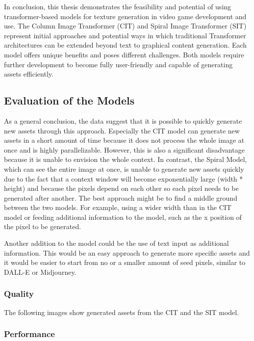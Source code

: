 
    In conclusion, this thesis demonstrates the feasibility and potential of using transformer-based models for texture generation in video game development and use. The Column Image Transformer (CIT) and Spiral Image Transformer (SIT) represent initial approaches and potential ways in which traditional Transformer architectures can be extended beyond text to graphical content generation. Each model offers unique benefits and poses different challenges. Both models require further development to become fully user-friendly and capable of generating assets efficiently.

\subsection{Evaluation of the Models}

    As a general conclusion, the data suggest that it is possible to quickly generate new assets through this approach. Especially the CIT model can generate new assets in a short amount of time because it does not process the whole image at once and is highly parallelizable. However, this is also a significant disadvantage because it is unable to envision the whole context. In contrast, the Spiral Model, which can see the entire image at once, is unable to generate new assets quickly due to the fact that a context window will become exponentially large (width * height) and because the pixels depend on each other so each pixel needs to be generated after another. The best approach might be to find a middle ground between the two models. For example, using a wider width than in the CIT model or feeding additional information to the model, such as the x position of the pixel to be generated.

    Another addition to the model could be the use of text input as additional information. This would be an easy approach to generate more specific assets and it would be easier to start from no or a smaller amount of seed pixels, similar to DALL-E or Midjourney.

\subsubsection{Quality}
    The following images show generated assets from the CIT and the SIT model.
    
    

\subsubsection{Performance}

